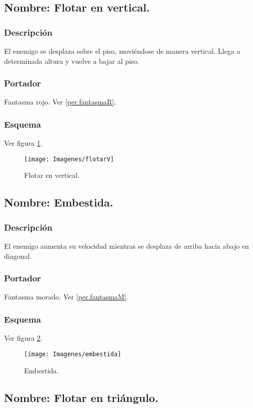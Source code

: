 \documentclass[11pt,letterpaper]{article}
\begin{document}
	\subsection{Nombre: Flotar en vertical.} \label{hab.flotarV}
		\subsubsection{Descripción}
		El enemigo se desplaza sobre el piso, moviéndose de manera vertical. Llega a determinada altura y vuelve a bajar al piso.
		\subsubsection{Portador}
		Fantasma rojo. Ver \ref{per.fantasmaR}.
		\subsubsection{Esquema}
		Ver figura \ref{fig:flotarV}.
		\begin{figure}
			\centering
			\texttt{[image: Imagenes/flotarV]}
			\caption{Flotar en vertical.}
			\label{fig:flotarV}
		\end{figure}
	\subsection{Nombre: Embestida.} \label{hab.embestida}
		\subsubsection{Descripción}
		El enemigo aumenta su velocidad mientras se desplaza de arriba hacia abajo en diagonal.
		\subsubsection{Portador}
		Fantasma morado. Ver \ref{per.fantasmaM}.
		\subsubsection{Esquema}
		Ver figura \ref{fig:embestida}.
		\begin{figure}
			\centering
			\texttt{[image: Imagenes/embestida]}
			\caption{Embestida.}
			\label{fig:embestida}
		\end{figure}
	\subsection{Nombre: Flotar en triángulo.} \label{hab.flotarT}
\end{document}
